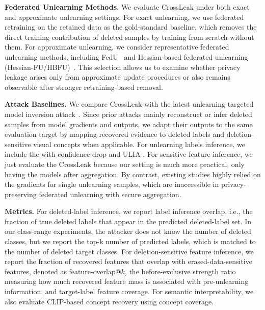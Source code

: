 \noindent
\textbf{Federated Unlearning Methods.}
We evaluate CrossLeak under both exact and approximate unlearning settings. For exact unlearning, we use federated retraining on the retained data as the gold-standard baseline, which removes the direct training contribution of deleted samples by training from scratch without them. For approximate unlearning, we consider representative federated unlearning methods, including FedU~\citep{wang2024fedu} and Hessian-based federated unlearning (Hessian-FU/HBFU)~\citep{liu2022right}. This selection allows us to examine whether privacy leakage arises only from approximate update procedures or also remains observable after stronger retraining-based removal. 



\noindent
\textbf{Attack Baselines.}
We compare CrossLeak with the latest unlearning-targeted model inversion attack~\citep{hu2024learn,wang2025label, zhou2026model}. Since prior attacks mainly reconstruct or infer deleted samples from model gradients and outputs, we adapt their outputs to the same evaluation target by mapping recovered evidence to deleted labels and deletion-sensitive visual concepts when applicable. For unlearning labels inference, we include the \citep{hu2024learn} with confidence-drop and ULIA \citep{wang2025label}. For sensitive feature inference, we just evaluate the CrossLeak because our setting is much more practical, only having the models after aggregation. By contrast, existing studies \citep{hu2024learn, zhou2026model} highly relied on the gradients for single unlearning samples, which are inaccessible in privacy-preserving federated unlearning with secure aggregation.


 
\noindent
\textbf{Metrics.}
For deleted-label inference, we report label inference overlap, i.e., the fraction of true deleted labels that appear in the predicted deleted-label set. In our class-range experiments, the attacker does not know the number of deleted classes, but we report the top-k number of predicted labels, which is matched to the number of deleted target classes. For deletion-sensitive feature inference, we report the fraction of recovered features that overlap with erased-data-sensitive features, denoted as feature-overlap@$k$, the before-exclusive strength ratio measuring how much recovered feature mass is associated with pre-unlearning information, and target-label feature coverage. For semantic interpretability, we also evaluate CLIP-based concept recovery using concept coverage.

